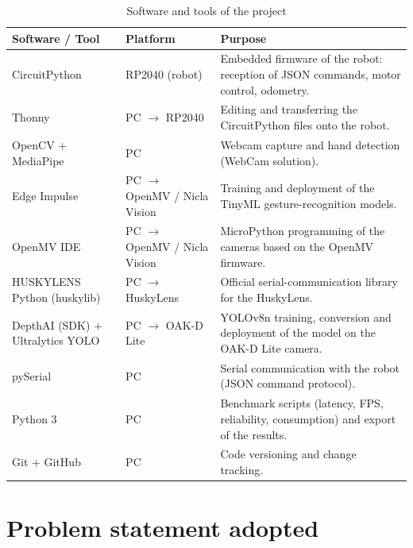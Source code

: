 \documentclass[12pt,a4paper]{report}
\begin{document}
	\begin{table}[H]
		\centering
		\renewcommand{\arraystretch}{1.5}
		\begin{tabularx}{\textwidth}{|p{2.8cm}|p{3.2cm}|X|}
			\hline
			\textbf{Software / Tool} & \textbf{Platform} & \textbf{Purpose} \\
			\hline
			CircuitPython & RP2040 (robot) & Embedded firmware of the robot: reception of JSON commands, motor control, odometry. \\
			\hline
			Thonny & PC $\rightarrow$ RP2040 & Editing and transferring the CircuitPython files onto the robot. \\
			\hline
			OpenCV + MediaPipe & PC & Webcam capture and hand detection (WebCam solution). \\
			\hline
			Edge Impulse & PC $\rightarrow$ OpenMV / Nicla Vision & Training and deployment of the TinyML gesture-recognition models. \\
			\hline
			OpenMV IDE & PC $\rightarrow$ OpenMV / Nicla Vision & MicroPython programming of the cameras based on the OpenMV firmware. \\
			\hline
			HUSKYLENS Python (huskylib) & PC $\rightarrow$ HuskyLens & Official serial-communication library for the HuskyLens. \\
			\hline
			DepthAI (SDK) + Ultralytics YOLO & PC $\rightarrow$ OAK-D Lite & YOLOv8n training, conversion and deployment of the model on the OAK-D Lite camera. \\
			\hline
			pySerial & PC & Serial communication with the robot (JSON command protocol). \\
			\hline
			Python 3 & PC & Benchmark scripts (latency, FPS, reliability, consumption) and export of the results. \\
			\hline
			Git + GitHub & PC & Code versioning and change tracking. \\
			\hline
		\end{tabularx}
		\caption{Software and tools of the project}
	\end{table}
	
	\newpage
	
	
	\section{Problem statement adopted}
	
\end{document}
